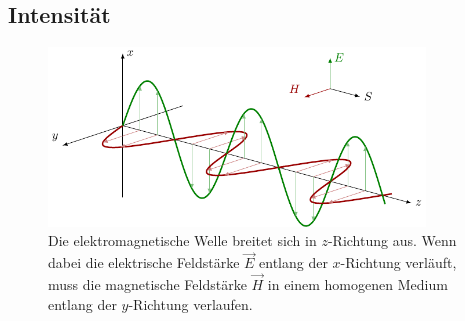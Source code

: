 \subsection{Intensität}
\label{opt:sec:intensity}

\begin{figure}
    \centering
    \includegraphics[width=100mm]{papers/opt/images/electromagnetic_wave.pdf}
    \caption{Die elektromagnetische Welle breitet sich in $z$-Richtung aus. 
    Wenn dabei die elektrische Feldstärke $\vec{E}$ entlang der $x$-Richtung verläuft, muss die magnetische Feldstärke $\vec{H}$ 
    in einem homogenen Medium entlang der $y$-Richtung verlaufen.}
    \label{opt:fig:electromagnetic_wave}
\end{figure}


